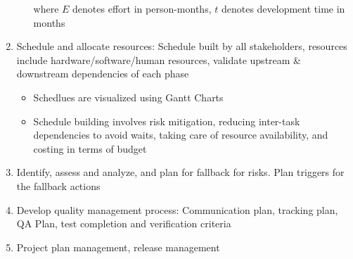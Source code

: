 \documentclass{article}
\begin{document}
\begin{enumerate}
\begin{itemize}
        where $E$ denotes effort in person-months, $t$ denotes development time in months
    \end{itemize}
    
    \item Schedule and allocate resources: Schedule built by all stakeholders, resources include hardware/software/human resources, validate upstream \& downstream dependencies of each phase 
    \begin{itemize}
        \item Schedlues are visualized using Gantt Charts
        
        \item Schedule building involves risk mitigation, reducing inter-task dependencies to avoid waits, taking care of resource availability, and costing in terms of budget
    \end{itemize}
    
    \item Identify, assess and analyze, and plan for fallback for risks. Plan triggers for the fallback actions
    
    \item Develop quality management process: Communication plan, tracking plan, QA Plan, test completion and verification criteria
    
    \item Project plan management, release management
\end{enumerate}
\end{document}
